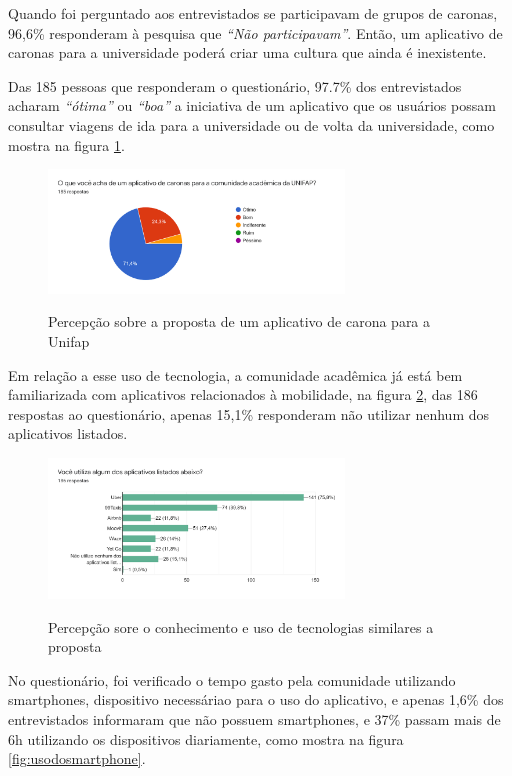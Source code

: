 Quando foi perguntado aos entrevistados se participavam de grupos de caronas, 96,6\% responderam à pesquisa que \textit{“Não participavam”}. Então, um aplicativo de caronas para a universidade poderá criar uma cultura que ainda é inexistente.

Das 185 pessoas que responderam o questionário, 97.7\% dos entrevistados acharam \textit{“ótima”} ou \textit{“boa”} a iniciativa de um aplicativo que os usuários possam consultar viagens de ida para a universidade ou de volta da universidade, como mostra na figura \ref{fig:percepcao}.
\begin{figure}[!hbtp]
	\centering
	\caption{Percepção sobre a proposta de um aplicativo de carona para a Unifap}
	\includegraphics[width=0.7\textwidth]{./04-figuras/questionario/15.png}
	\label{fig:percepcao}
\end{figure}

Em relação a esse uso de tecnologia, a comunidade acadêmica já está bem familiarizada com aplicativos relacionados à mobilidade, na figura \ref{fig:conhecimento-sobre-apps}, das 186 respostas ao questionário, apenas 15,1\% responderam não utilizar nenhum dos aplicativos listados.

\begin{figure}[!hbtp]
	\centering
	\caption{Percepção sore o conhecimento e uso de tecnologias similares a proposta}
	\includegraphics[width=0.7\textwidth]{./04-figuras/questionario/16.png}
	\label{fig:conhecimento-sobre-apps}
\end{figure}

No questionário, foi verificado o tempo gasto pela comunidade utilizando smartphones, dispositivo necessáriao para o uso do aplicativo, e apenas 1,6\% dos entrevistados informaram que não possuem smartphones, e 37\% passam mais de 6h utilizando os dispositivos diariamente, como mostra na figura \ref{fig:usodosmartphone}.

